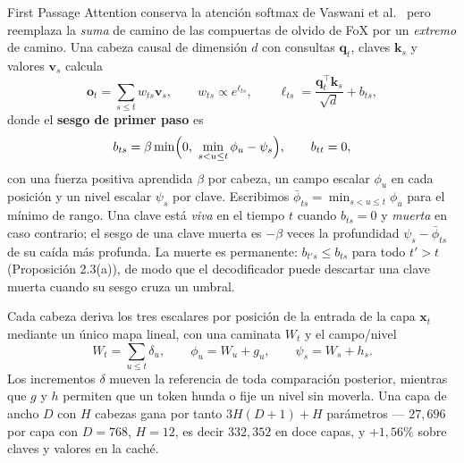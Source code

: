 First Passage Attention \citep{liu_first_passage_2026} conserva la atención softmax de Vaswani et al.~\citep{vaswani_attention_2017} pero reemplaza la \emph{suma} de camino de las compuertas de olvido de FoX por un \emph{extremo} de camino. Una cabeza causal de dimensión $d$ con consultas $\mathbf{q}_t$, claves $\mathbf{k}_s$ y valores $\mathbf{v}_s$ calcula
\[
\mathbf{o}_t=\sum_{s\le t}w_{ts}\mathbf{v}_s,\qquad w_{ts}\propto e^{\ell_{ts}},\qquad
\ell_{ts}=\frac{\mathbf{q}_t^\top\mathbf{k}_s}{\sqrt{d}}+b_{ts},
\]
donde el \textbf{sesgo de primer paso} es
\[
b_{ts}=\beta\min\Bigl(0,\ \min_{s<u\le t}\phi_u-\psi_s\Bigr),\qquad b_{tt}=0,
\]
con una fuerza positiva aprendida $\beta$ por cabeza, un campo escalar $\phi_u$ en cada posición y un nivel escalar $\psi_s$ por clave. Escribimos $\bar{\phi}_{ts}=\min_{s<u\le t}\phi_u$ para el mínimo de rango. Una clave está \emph{viva} en el tiempo $t$ cuando $b_{ts}=0$ y \emph{muerta} en caso contrario; el sesgo de una clave muerta es $-\beta$ veces la profundidad $\psi_s-\bar{\phi}_{ts}$ de su caída más profunda. La muerte es permanente: $b_{t's}\le b_{ts}$ para todo $t'>t$ (Proposición 2.3(a)), de modo que el decodificador puede descartar una clave muerta cuando su sesgo cruza un umbral.

Cada cabeza deriva los tres escalares por posición de la entrada de la capa $\mathbf{x}_t$ mediante un único mapa lineal, con una caminata $W_t$ y el campo/nivel
\[
W_t=\sum_{u\le t}\delta_u,\qquad \phi_u=W_u+g_u,\qquad \psi_s=W_s+h_s .
\]
Los incrementos $\delta$ mueven la referencia de toda comparación posterior, mientras que $g$ y $h$ permiten que un token hunda o fije un nivel sin moverla. Una capa de ancho $D$ con $H$ cabezas gana por tanto $3H(D+1)+H$ parámetros --- $27{,}696$ por capa con $D=768$, $H=12$, es decir $332{,}352$ en doce capas, y $+1{,}56\%$ sobre claves y valores en la caché.

